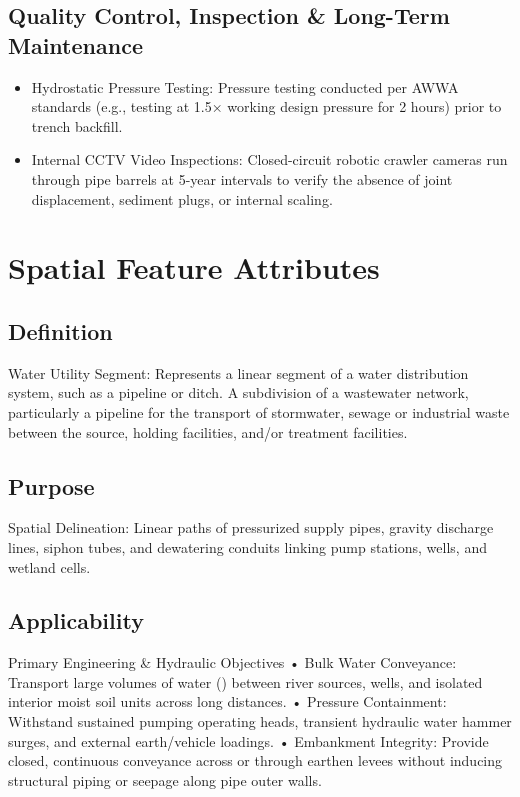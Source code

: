 \documentclass[
  letterpaper,
  DIV=11,
  numbers=noendperiod]{scrreprt}
\begin{document}
\subsection{Quality Control, Inspection \& Long-Term
Maintenance}\label{quality-control-inspection-long-term-maintenance-25}

\begin{itemize}
\item
  Hydrostatic Pressure Testing: Pressure testing conducted per AWWA
  standards (e.g., testing at 1.5× working design pressure for 2 hours)
  prior to trench backfill.
\item
  Internal CCTV Video Inspections: Closed-circuit robotic crawler
  cameras run through pipe barrels at 5-year intervals to verify the
  absence of joint displacement, sediment plugs, or internal scaling.
\end{itemize}

\section{Spatial Feature Attributes}\label{spatial-feature-attributes-9}

\subsection{Definition}\label{definition-25}

Water Utility Segment: Represents a linear segment of a water
distribution system, such as a pipeline or ditch. A subdivision of a
wastewater network, particularly a pipeline for the transport of
stormwater, sewage or industrial waste between the source, holding
facilities, and/or treatment facilities.

\subsection{Purpose}\label{purpose-29}

Spatial Delineation: Linear paths of pressurized supply pipes, gravity
discharge lines, siphon tubes, and dewatering conduits linking pump
stations, wells, and wetland cells.

\subsection{Applicability}\label{applicability-26}

Primary Engineering \& Hydraulic Objectives • Bulk Water Conveyance:
Transport large volumes of water () between river sources, wells, and
isolated interior moist soil units across long distances. • Pressure
Containment: Withstand sustained pumping operating heads, transient
hydraulic water hammer surges, and external earth/vehicle loadings. •
Embankment Integrity: Provide closed, continuous conveyance across or
through earthen levees without inducing structural piping or seepage
along pipe outer walls.
\end{document}
